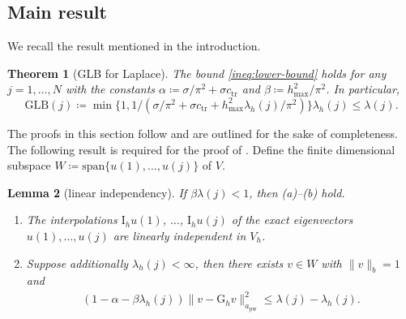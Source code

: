 \documentclass[a4paper]{amsart}
\numberwithin{equation}{section}
\newcommand{\I}{\mathrm{I}}
\newcommand{\pw}{\mathrm{pw}}
\newtheorem{theorem}{Theorem}[section]
\newtheorem{lemma}[theorem]{Lemma}
\theoremstyle{remark}
\theoremstyle{definition}
\theoremstyle{assumptionnoperiod}
\begin{document}
\subsection{Main result}
We recall the result mentioned in the introduction.
\begin{theorem}[GLB for Laplace]\label{thm:dLEB}
	The bound \eqref{ineq:lower-bound} holds for any $j = 1, \dots, N$ with the constants $\alpha \coloneqq \sigma/\pi^2 + \sigma c_\mathrm{tr}$ and $\beta \coloneqq h_{\max}^2/\pi^2$. In particular,
	$$\mathrm{GLB}(j) \coloneqq \min\{1, 1/(\sigma/\pi^2 + \sigma c_\mathrm{tr} + h_\mathrm{max}^2 \lambda_h(j)/\pi^2)\}\lambda_h(j) \leq \lambda(j).$$
\end{theorem}
The proofs in this section follow \cite{CarstensenZhaiZhang2020} and are outlined for the sake of completeness. The following result is required for the proof of .
Define the finite dimensional subspace $W \coloneqq \mathrm{span}\{u(1), \dots, u(j)\}$ of $V$.
\begin{lemma}[linear independency]\label{lem:linear-independency}
	If $\beta \lambda(j) < 1$, then (a)--(b) hold.
	\begin{enumerate}[wide]
		\item[(a)] The interpolations $\I_h u(1)$, $\dots$, $\I_h u(j)$ of the exact eigenvectors $u(1), \dots, u(j)$ are linearly independent in $V_h$.
		\item[(b)] Suppose additionally $\lambda_h(j) < \infty$, then there exists $v \in W$ with $\|v\|_b = 1$ and
		\begin{align*}
			(1 - \alpha - \beta \lambda_h(j))\|v - \mathrm{G}_h v\|_{a_\pw}^2 \leq \lambda(j) - \lambda_h(j).
		\end{align*}
	\end{enumerate}
\end{lemma}
\end{document}

